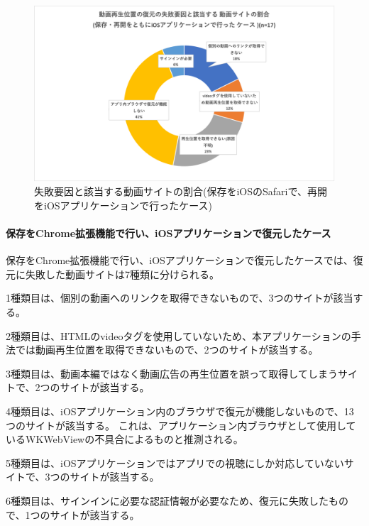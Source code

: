 \begin{figure}[htbp]
  \label{fig:evl-consideration-video-cause-ratio-ios}
  \begin{center}
    \includegraphics[bb=0 0 684.44444444 400.22222222,width=15cm]{img/060_evaluation/consideration/video/cause-ratio-ios.pdf}
  \end{center}
  \caption{失敗要因と該当する動画サイトの割合(保存をiOSのSafariで、再開をiOSアプリケーションで行ったケース)}
\end{figure}

\paragraph{保存をChrome拡張機能で行い、iOSアプリケーションで復元したケース}
保存をChrome拡張機能で行い、iOSアプリケーションで復元したケースでは、復元に失敗した動画サイトは7種類に分けられる。

1種類目は、個別の動画へのリンクを取得できないもので、3つのサイトが該当する。

2種類目は、HTMLのvideoタグを使用していないため、本アプリケーションの手法では動画再生位置を取得できないもので、2つのサイトが該当する。

3種類目は、動画本編ではなく動画広告の再生位置を誤って取得してしまうサイトで、2つのサイトが該当する。

4種類目は、iOSアプリケーション内のブラウザで復元が機能しないもので、13つのサイトが該当する。
これは、アプリケーション内ブラウザとして使用しているWKWebViewの不具合によるものと推測される。

5種類目は、iOSアプリケーションではアプリでの視聴にしか対応していないサイトで、3つのサイトが該当する。

6種類目は、サインインに必要な認証情報が必要なため、復元に失敗したもので、1つのサイトが該当する。


